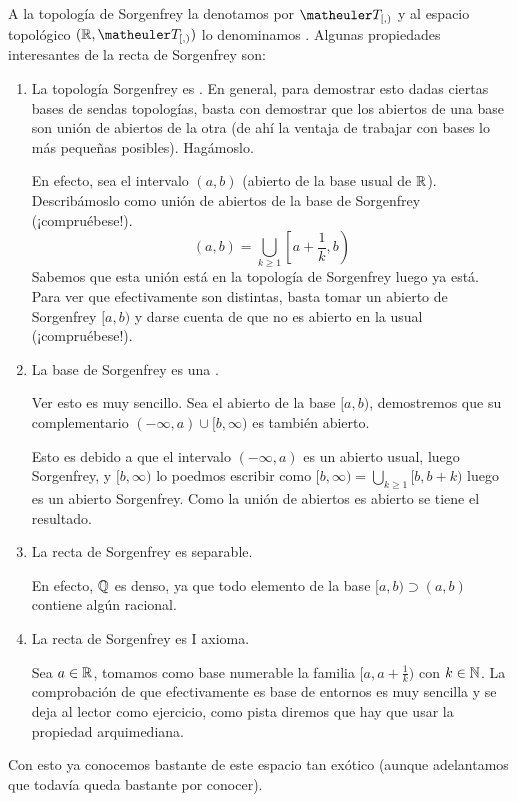 	\begin{exa}
		\label{etop_sorgenfrey}
		A la topología de Sorgenfrey la denotamos por $\T_{[,)}$ y al espacio topológico $(\R,\T_{[,)})$ lo denominamos . Algunas propiedades interesantes de la recta de Sorgenfrey son:
	\begin{enumerate}
		\item La topología Sorgenfrey es . En general, para demostrar esto dadas ciertas bases de sendas topologías, basta con demostrar que los abiertos de una base son unión de abiertos de la otra (de ahí la ventaja de trabajar con bases lo más pequeñas posibles). Hagámoslo.
		
		En efecto, sea el intervalo $(a,b)$ (abierto de la base usual de $\mathbb{R}$). Describámoslo como unión de abiertos de la base de Sorgenfrey (¡compruébese!).
		\begin{equation}
			(a,b) = \bigcup_{k\geq 1} \left[a+\frac{1}{k},b\right)
		\end{equation}
		Sabemos que esta unión está en la topología de Sorgenfrey luego ya está.
	Para ver que efectivamente son distintas, basta tomar un abierto de Sorgenfrey $[a,b)$ y darse cuenta de que no es abierto en la usual (¡compruébese!).
	
	\item La base de Sorgenfrey es una .
	
	Ver esto es muy sencillo. Sea el abierto de la base $[a,b)$, demostremos que su complementario $(-\infty, a) \cup [b,\infty)$ es también abierto.
	
	Esto es debido a  que el intervalo $(-\infty, a)$ es un abierto usual, luego Sorgenfrey, y $[b,\infty)$ lo poedmos escribir como $[b,\infty) = \bigcup_{k\geq1} [b, b+k)$ luego es un abierto Sorgenfrey. Como la unión de abiertos es abierto se tiene el resultado.
	\item La recta de Sorgenfrey es separable.
	
	En efecto, $\mathbb{Q}$ es denso, ya que todo elemento de la base $[a,b)\supset(a,b)$ contiene algún racional.
	\item La recta de Sorgenfrey es I axioma.
	
	Sea $a\in\mathbb{R}$, tomamos como base numerable la familia $[a, a+\frac{1}{k})$ con $k\in\mathbb{N}$. La comprobación de que efectivamente es base de entornos es muy sencilla y se deja al lector como ejercicio, como pista diremos que hay que usar la propiedad arquimediana.
	\end{enumerate}
	Con esto ya conocemos bastante de este espacio tan exótico (aunque adelantamos que todavía queda bastante por conocer).
\end{exa}


